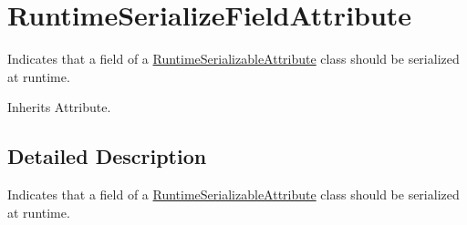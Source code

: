 \hypertarget{class_voxel_busters_1_1_runtime_serialization_1_1_runtime_serialize_field_attribute}{}\section{Runtime\+Serialize\+Field\+Attribute}
\label{class_voxel_busters_1_1_runtime_serialization_1_1_runtime_serialize_field_attribute}


Indicates that a field of a \hyperlink{class_voxel_busters_1_1_runtime_serialization_1_1_runtime_serializable_attribute}{Runtime\+Serializable\+Attribute} class should be serialized at runtime.  




Inherits Attribute.



\subsection{Detailed Description}
Indicates that a field of a \hyperlink{class_voxel_busters_1_1_runtime_serialization_1_1_runtime_serializable_attribute}{Runtime\+Serializable\+Attribute} class should be serialized at runtime. 

